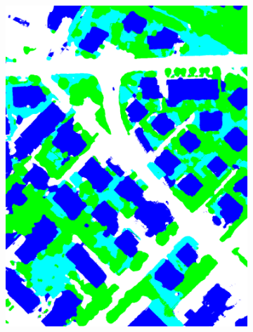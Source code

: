 \begin{figure}[htb]
\begin{subfigure}{0.24\textwidth}
   \includegraphics[width=1\linewidth]{fig/vai/30_manual.png}
 \end{subfigure}
 \begin{subfigure}{0.24\textwidth}
   \centering

\end{subfigure}
\end{figure}
